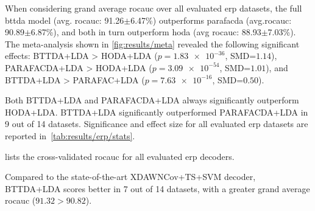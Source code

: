 \documentclass[twocolumn]{article}
\begin{document}
When considering grand average \ac{rocauc} over all evaluated \ac{erp} datasets,
the full \ac{bttda} model (avg. \ac{rocauc}: 91.26$\pm$6.47\%) outperforms \ac{parafacda}
(avg.\ac{rocauc}: 90.89$\pm$6.87\%),
and both in turn outperform \ac{hoda} (avg \ac{rocauc}: 88.93$\pm$7.03\%).
The meta-analysis shown in \cref{fig:results/meta} revealed the following
significant effects:
BTTDA+LDA > HODA+LDA ($p=\num{1.83e-36}$, SMD=$1.14$),
PARAFACDA+LDA > HODA+LDA ($p=\num{3.09e-54}$, SMD=$1.01$), and
BTTDA+LDA > PARAFAC+LDA ($p=\num{7.63e-16}$, SMD=$0.50$).
Both BTTDA+LDA and PARAFACDA+LDA always significantly outperform HODA+LDA.
BTTDA+LDA significantly outperformed PARAFACDA+LDA in 9 out of 14 datasets.
Significance and effect size for all evaluated \ac{erp} datasets are reported in~\cref{tab:results/erp/stats}.

 lists the cross-validated \ac{rocauc} for all evaluated
\ac{erp} decoders.
\begin{sidewaystable*}
	\footnotesize
	
	\caption{Area under the receiver operating characteristic curve for
		cross-validated within-session evaluation of HODA+LDA and our proposed decoders
		PARAFACDA+DLA and BTTDA+LDA evaluated on \ac{erp} datasets.
		Scores for other decoders were taken from \textcite{Chevallier2024}.
		BTTDA+LDA always outperforms HODA+LDA and PARAFACDA+LDA, except for datasets,
		and consistently is nearly on par with or outperforms
		the state-of-the-art XDAwnCov+TS+SVM decoder.
	}
	\label{tab:results/erp/score}
\end{sidewaystable*}
Compared to the state-of-the-art XDAWNCov+TS+SVM decoder, BTTDA+LDA scores
better in 7 out of 14 datasets, with a greater grand average \ac{rocauc}
($91.32 > 90.82$).
\end{document}
